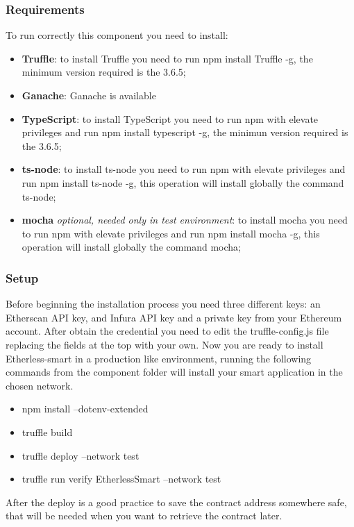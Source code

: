 \subsubsection{Requirements}
To run correctly this component you need to install:
\begin{itemize}
    \item \textbf{Truffle}: to install Truffle you need to run npm install Truffle -g, the minimum version required is the 3.6.5;
    \item \textbf{Ganache}: Ganache is available 
    \item \textbf{TypeScript}: to install TypeScript you need to run npm with elevate privileges and run npm install typescript -g, the minimun version required is the 3.6.5;
    \item \textbf{ts-node}: to install ts-node you need to run npm with elevate privileges and run npm install ts-node -g, this operation will install globally the command ts-node;
    \item \textbf{mocha} \textit{optional, needed only in test environment}: to install mocha you need to run npm with elevate privileges and run npm install mocha -g, this operation will install globally the command mocha;
\end{itemize}

\subsubsection{Setup}
Before beginning the installation process you need three different keys: an Etherscan API key, and Infura API key and a private key from your Ethereum account.
After obtain the credential you need to edit the truffle-config.js file replacing the fields at the top with your own.
Now you are ready to install Etherless-smart in a production like environment, running the following commands from the component folder will install your smart application in the chosen network.

\begin{itemize}
    \item npm install --dotenv-extended
    \item truffle build
    \item truffle deploy --network test
    \item truffle run verify EtherlessSmart --network test
\end{itemize}
After the deploy is a good practice to save the contract address somewhere safe, that will be needed when you want to retrieve the contract later.
